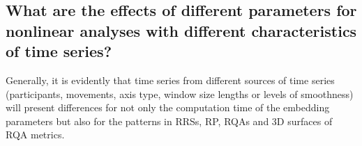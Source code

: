 %
%
%
%
%
%
%



\subsection{What are the effects 
	of different parameters for nonlinear analyses 
	with different characteristics of time series?}
Generally, it is evidently that time series from different sources 
of time series (participants, movements, axis type, window size lengths or 
levels of smoothness) will present differences for not only 
the computation time of the embedding parameters but also for the 
patterns in RRSs, RP, RQAs and 3D surfaces of RQA metrics. 

